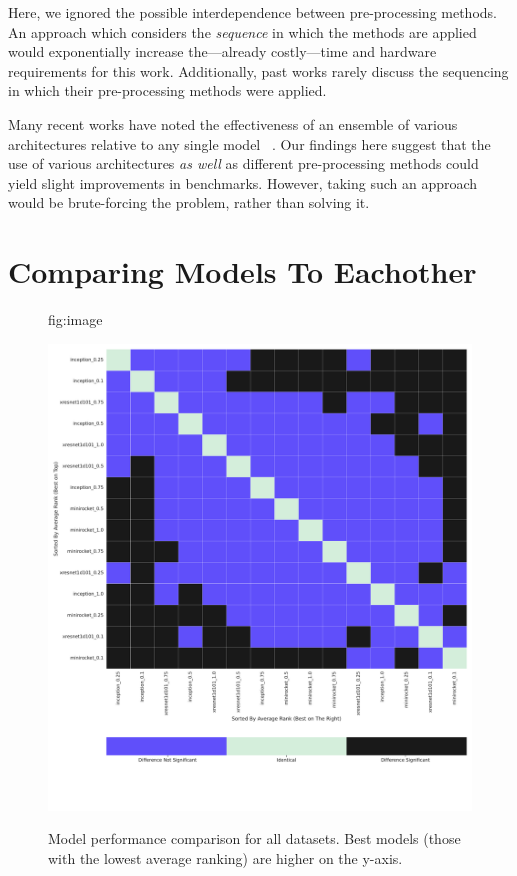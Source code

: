 \documentclass[pmlr,twocolumn]{jmlr}%
\begin{document}
Here, we ignored the possible interdependence between pre-processing methods. An approach which considers the \textit{sequence} in which the methods are applied would exponentially increase the---already costly---time and hardware requirements for this work. Additionally, past works rarely discuss the sequencing in which their pre-processing methods were applied. 

Many recent works have noted the effectiveness of an  ensemble of various architectures relative to any single model ~\citep{uwaechia2021comprehensive,hong2022practical,IsmailFawaz2018deep,strodthoff2020deep,chen2020detection}. Our findings here suggest that the use of various architectures \textit{as well} as different pre-processing methods could yield slight improvements in benchmarks. However, taking such an approach would be brute-forcing the problem, rather than solving it. 



\appendix

\section{Comparing Models To Eachother}
\label{apd:model_vs_model}
\begin{figure}[htbp]
\floatconts
  {fig:image}
  {\caption{Model performance comparison for all datasets. Best models (those with the lowest average ranking) are higher on the y-axis.}}
  {\includegraphics[width=1\linewidth]{images/model_comparisons_alldatasets.pdf}}
 
\end{figure}
\end{document}

